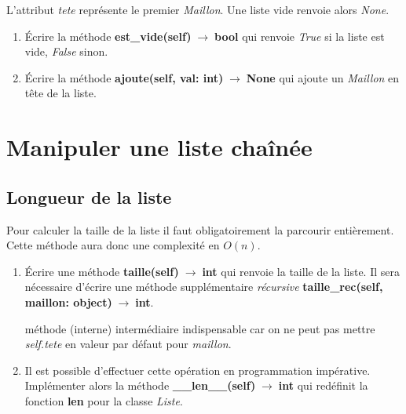 \documentclass[a4paper,11pt]{article}
\begin{document}
\begin{Form}
\begin{figure}[!h]
\end{figure}
L'attribut \textit{tete} représente le premier \textit{Maillon}. Une liste vide renvoie alors \textit{None}.
\begin{activite}
\begin{enumerate}
\item Écrire la méthode \textbf{est\_vide(self)$\;\rightarrow\;$bool} qui renvoie \textit{True} si la liste est vide, \textit{False} sinon.
\item Écrire la méthode \textbf{ajoute(self, val: int)$\;\rightarrow\;$None} qui ajoute un \textit{Maillon} en tête de la liste.
\end{enumerate}
\end{activite}
\section{Manipuler une liste chaînée}
\subsection{Longueur de la liste}
Pour calculer la taille de la liste il faut obligatoirement la parcourir entièrement. Cette méthode aura donc une complexité en $O(n)$.
\begin{activite}
\begin{enumerate}
\item Écrire une méthode \textbf{taille(self)$\;\rightarrow\;$int} qui renvoie la taille de la liste. Il sera nécessaire d'écrire une méthode supplémentaire \textit{récursive} \textbf{taille\_rec(self, maillon: object)$\;\rightarrow\;$int}.
\begin{commentprof}
méthode (interne) intermédiaire indispensable car on ne peut pas mettre \textit{self.tete} en valeur par défaut pour \textit{maillon}.
\end{commentprof}
\item Il est possible d'effectuer cette opération en programmation impérative. Implémenter alors la méthode \textbf{\_\_len\_\_(self)$\;\rightarrow\;$int} qui redéfinit la fonction \textbf{len} pour la classe \textit{Liste}. 
\end{enumerate}
\end{activite}

\end{Form}
\end{document}
